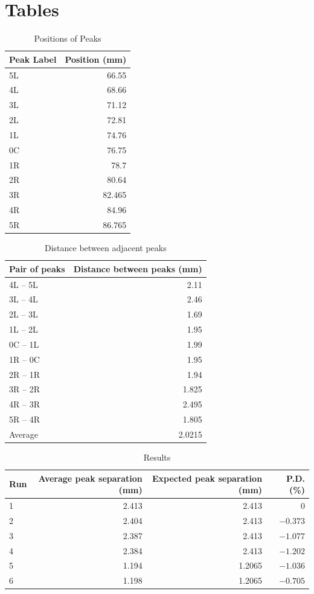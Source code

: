 \section{Tables}
%
\begin{table}[ht!]
	\centering
	\begin{tabular}{|l|r|} \hline
		Peak Label & Position (mm) \\
		\hline
		5L & 66.55 \\
		4L & 68.66 \\
		3L & 71.12 \\
		2L & 72.81 \\
		1L & 74.76 \\
		0C & 76.75 \\
		1R & 78.7 \\
		2R & 80.64 \\
		3R & 82.465 \\
		4R & 84.96 \\
		5R & 86.765 \\
		\hline
	\end{tabular}
	\caption{Positions of Peaks}
	\label{table.10.pos}
\end{table}
%
\begin{table}[ht!]
	\centering
	\begin{tabular}{|l|r|} \hline
		Pair of peaks & Distance between peaks (mm) \\
		\hline
		4L -- 5L & 2.11 \\
		3L -- 4L & 2.46 \\
		2L -- 3L & 1.69 \\
		1L -- 2L & 1.95 \\
		0C -- 1L & 1.99 \\
		1R -- 0C & 1.95 \\
		2R -- 1R & 1.94 \\
		3R -- 2R & 1.825 \\
		4R -- 3R & 2.495 \\
		5R -- 4R & 1.805 \\
		\hline
		Average & 2.0215 \\
		\hline
	\end{tabular}
	\caption{Distance between adjacent peaks}
	\label{table.10.disA}
\end{table}
%
\newpage
\begin{table}[ht!]
	\centering
	\begin{tabular}{|l|r|r|r|}
		\hline
		Run & Average peak separation (mm) & Expected peak separation (mm) & P.D. (\%) \\
		\hline
		1 & 2.413 & 2.413 & 0 \\
		2 & 2.404 & 2.413 & $-0.373$ \\
		3 & 2.387 & 2.413 & $-1.077$ \\
		4 & 2.384 & 2.413 & $-1.202$ \\
		5 & 1.194 & 1.2065 & $-1.036$ \\
		6 & 1.198 & 1.2065 &  $-0.705$\\
		\hline
	\end{tabular}
	\caption{Results}
	\label{table.10.results}
\end{table}
